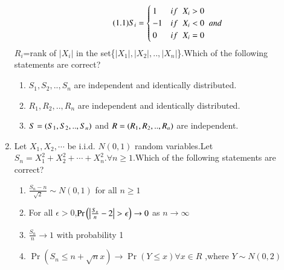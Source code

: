\begin{enumerate}[label=\thesection.\arabic*.,ref=\thesection.\theenumi]
\begin{align}
\tag{1.1}
\label{eq1}
S_{i} = 
\begin{cases}
1 & if \hspace{0.2cm}X_{i}>0
\\
-1 & if\hspace{0.2cm} X_{i}<0 \hspace{0.2cm} and
\\
0 & if \hspace{0.2cm}X_{i}=0
\end{cases}
\end{align}
$R_{i}$=rank of $|X_{i}|$ in the set\{$|X_{1}|,|X_{2}|,..,|X_{n}|$\}.Which of the following statements are correct?
\begin{enumerate}
\item $S_{1},S_{2},..,S_{n}$ are independent and identically distributed.
\item $R_{1},R_{2},..,R_{n}$ are independent and identically distributed.
\item $S=\left(S_{1},S_{2},..,S_{n}\right)$ and $R=\left( R_{1},R_{2},..,R_{n}\right)$ are independent.
\end{enumerate}
%
\solution

%
\item Let $X_1,X_2, \cdots$ be i.i.d. $N(0,1)$ random variables.Let $S_{n}=X_{1}^2+X_{2}^2+\cdots+X_{n}^2.\forall n\geq 1.$Which of the following statements are correct?
\begin{enumerate}
\setlength\itemsep{1em}
\item $\frac{S_{n}-n}{\sqrt{2}}\sim N(0,1)$ for all $n\geq 1$
\item For all $\epsilon > 0$,$\Pr{\brak{\left|\frac{S_n}{n}-2\right|>\epsilon}}\to 0$ as $n \to \infty$
\item $\frac{S_{n}}{n} \to 1$ with probability 1
\item $\Pr({S_{n} \leq n+\sqrt{n}x}) \to \Pr({Y \leq x}) \forall x\in R$ ,where $Y \sim N(0,2)$
\end{enumerate}
%
\solution




\end{enumerate}

